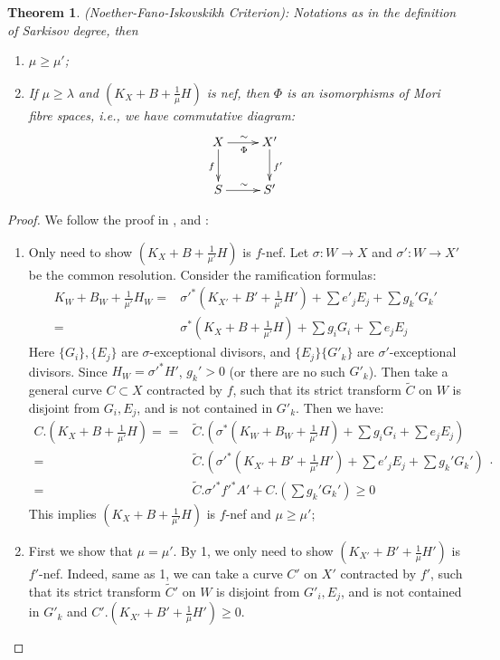 \documentclass[11pt]{amsart}
\numberwithin{equation}{section}
\newtheorem{thm}[defn]{Theorem}
\begin{document}
\begin{thm}\label{nfi}
  (Noether-Fano-Iskovskikh Criterion): Notations as in the definition of Sarkisov degree, then 
  \begin{enumerate}
    \item $ \mu\geqslant \mu' $;
    \item If $ \mu \geqslant \lambda $ and $ (K_X+B+\frac{1}{\mu} H) $ is nef, then $\Phi$ is an isomorphisms of Mori fibre spaces, i.e., we have commutative diagram: 
      \[ \xymatrix{
          X\ar[r]^\sim_\Phi\ar[d]_f&X'\ar[d]^{f'}\\
      S\ar[r]^\sim& S' } \]
  \end{enumerate}
\end{thm}

\begin{proof}
  We follow the proof in \cite{haconMinimalModelProgram2012},\cite{liuSarkisovProgramGeneralized2021} and \cite{cortiFactoringBirationalMaps}:
  \begin{enumerate}
    \item Only need to show $ (K_X+B+\frac{1}{\mu'}H) $ is $ f $-nef.   Let $\sigma:W\to X$ and $\sigma':W\to X'$ be the common resolution. Consider the ramification formulas:
      \[
        \begin{aligned}  
          K_W+B_W+\frac{1}{\mu'}H_W=&\sigma'^*(K_{X'}+B'+\frac{1}{\mu'}H')+\sum e'_jE_j+ \sum g_k'G_k'\\
          =&\sigma^*(K_{X}+B+\frac{1}{\mu'}H)+\sum g_iG_i+\sum e_jE_j
        \end{aligned}
      \]
      Here $ \{G_i\}, \{E_j\} $ are $ \sigma $-exceptional divisors, and $ \{E_j\}\{G'_k\} $ are $ \sigma' $-exceptional divisors. Since $H_W=\sigma'^*H' $, $ g_k'>0 $ (or there are no such $ G'_k $). Then take a general curve $ C\subset X $ contracted by $ f $, such that its strict transform $ \tilde{C} $ on $ W $ is disjoint from $ G_i, E_j $, and is not contained in $ G'_k $. Then we have:
      \[
        \begin{aligned}
          C.\left(K_X+B+\frac{1}{\mu'}H\right)==&\tilde{C}.\left(\sigma^*\left(K_W+B_{W}+\frac{1}{\mu'}H\right)+\sum g_iG_i+\sum e_jE_j\right)\\
          =&\tilde{C}.\left(\sigma'^*\left(K_{X'}+B'+\frac{1}{\mu'}H'\right)+\sum e'_jE_j+ \sum g_k'G_k'\right)\\
          =&\tilde{C}.\sigma'^*f'^*A'+C.\left(\sum g_k'G_k'\right) \geqslant0
        \end{aligned}
      .\]
     This implies $ (K_X+B+\frac{1}{\mu'}H) $ is $ f $-nef and $ \mu\geqslant \mu' $;
   \item  First we show that $ \mu=\mu' $. By 1, we only need to show $ (K_{X'}+B'+\frac{1}{\mu}H') $ is $ f' $-nef. Indeed,  same as 1, we can take a curve $ C' $ on $X'$ contracted by $f'$, such that its strict transform $\tilde{C}'$ on $W$ is disjoint from  $ G'_i, E_j $, and is not contained in $ G'_k $ and 
     $C'.\left(K_{X'}+B'+\frac{1}{\mu}H'\right)\geqslant 0$.


\end{enumerate}
\end{proof}
\end{document}
